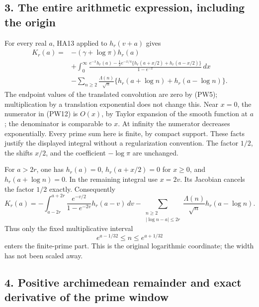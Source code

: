 \documentclass[
  10pt,
  a4paper,
]{article}
\begin{document}
\subsection{3. The entire arithmetic expression, including the
origin}\label{the-entire-arithmetic-expression-including-the-origin}

For every real \(a\), HA13 applied to \(h_r(v+a)\) gives \[
\begin{aligned}
 K_r(a)={}&-(\gamma+\log\pi)h_r(a)\\
 &+\int_0^\infty
 \frac{e^{-x}h_r(a)-\tfrac12e^{-x/4}
       \{h_r(a+x/2)+h_r(a-x/2)\}}{1-e^{-x}}\,dx\\
 &-\sum_{n\ge2}\frac{\Lambda(n)}{\sqrt n}
       \{h_r(a+\log n)+h_r(a-\log n)\}.
\end{aligned}
\tag{PW12}
\] The endpoint values of the translated convolution are zero by (PW5);
multiplication by a translation exponential does not change this. Near
\(x=0\), the numerator in (PW12) is \(O(x)\), by Taylor expansion of the
smooth function at \(a\); the denominator is comparable to \(x\). At
infinity the numerator decreases exponentially. Every prime sum here is
finite, by compact support. These facts justify the displayed integral
without a regularization convention. The factor \(1/2\), the shifts
\(x/2\), and the coefficient \(-\log\pi\) are unchanged.

For \(a>2r\), one has \(h_r(a)=0\), \(h_r(a+x/2)=0\) for \(x\ge0\), and
\(h_r(a+\log n)=0\). In the remaining integral use \(x=2v\). Its
Jacobian cancels the factor \(1/2\) exactly. Consequently \[
\boxed{
 K_r(a)=-\int_{a-2r}^{a+2r}
       \frac{e^{-v/2}}{1-e^{-2v}}h_r(a-v)\,dv
       -\sum_{\substack{n\ge2\\|\log n-a|\le2r}}
        \frac{\Lambda(n)}{\sqrt n}h_r(a-\log n).}
\tag{PW13}
\] Thus only the fixed multiplicative interval \[
 e^{a-1/32}\le n\le e^{a+1/32}
\tag{PW14}
\] enters the finite-prime part. This is the original logarithmic
coordinate; the width has not been scaled away.

\subsection{4. Positive archimedean remainder and exact derivative of
the prime
window}\label{positive-archimedean-remainder-and-exact-derivative-of-the-prime-window}
\end{document}
